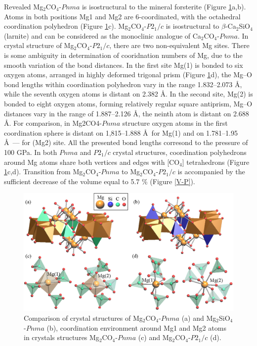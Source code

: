 \documentclass[a4paperm]{article}
\begin{document}
Revealed Mg$_2$CO$_4$-$Pnma$ is isostructural to the mineral forsterite (Figure \ref{str}a,b).
Atoms in both positions Mg1 and Mg2 are 6-coordinated, with the octahedral coordination polyhedron (Figure \ref{str}c). 
Mg$_2$CO$_4$-$P2_1/c$ is isostructural to $\beta$-Ca$_2$SiO$_4$ (larnite) and can be considered as the monoclinic analogue of Ca$_2$CO$_4$-$Pnma$.
In crystal structure of Mg$_2$CO$_4$-$P2_1/c$, there are two non-equivalent Mg sites.
There is some ambiguity in determination of cooridnation numbers of Mg, due to the smooth variation of the bond distances.
In the first site Mg(1) is bonded to six oxygen atoms, arranged in highly deformed trigonal prism  (Figure \ref{str}d), the Mg--O bond lengths within coordination polyhedron vary in the range 1.832--2.073 \AA, while the seventh oxygen atoms is distant on 2.382 \AA.
In the second site, Mg(2) is bonded to eight oxygen atoms, forming relatively regular square antiprism, Mg--O distances vary in the range of 1.887--2.126 \AA, the neinth atom is distant on 2.688 \AA.
For comparison, in Mg2CO4-$Pnma$ structure oxygen atoms in the first coordination sphere is distant on 1,815--1.888 \AA\ for Mg(1) and on 1.781--1.95 \AA\ --- for (Mg2) site.
All the presented bond lengths corresond to the pressure of 100 GPa.
In both $Pnma$ and $P2_1/c$ crystal structures, coordination polyhedrons around Mg atoms share both vertices and edges with [CO$_4$] tetrahedrons (Figure \ref{str}c,d).
Transition from Mg$_2$CO$_4$-$Pnma$ to Mg$_2$CO$_4$-$P2_1/c$ is accompanied by the sufficient decrease of the volume equal to 5.7 \% (Figure \ref{V-P}).

\begin{figure}[H]
	\includegraphics[width=\textwidth]{mg2co4_str} \centering
	\caption{Comparison of crystal structures of Mg$_2$CO$_4$-$Pnma$ (a) and Mg$_2$SiO$_4$-$Pnma$ (b), coordination environment around Mg1 and Mg2 atoms in crystals structures Mg$_2$CO$_4$-$Pnma$ (c) and Mg$_2$CO$_4$-$P2_1/c$ (d).} 	\label{str}
\end{figure}
\end{document}
